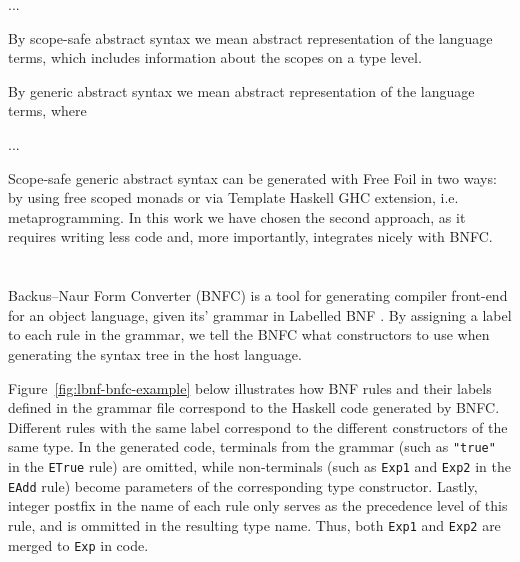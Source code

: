 ...

By scope-safe abstract syntax we mean abstract representation of the language terms, which includes information about the scopes on a type level.

By generic abstract syntax we mean abstract representation of the language terms, where 

...

Scope-safe generic abstract syntax can be generated with Free Foil in two ways: by using free scoped monads or via Template Haskell \cite{SheardPeytonJones2002_TH} GHC extension, i.e. metaprogramming. In this work we have chosen the second approach, as it requires writing less code and, more importantly, integrates nicely with BNFC.


\section{}

Backus–Naur Form Converter (BNFC) \cite{BNFC} is a tool for generating compiler front-end for an object language, given its' grammar in Labelled BNF \cite{BackusNaurForm2003}. By assigning a label to each rule in the grammar, we tell the BNFC what constructors to use when generating the syntax tree in the host language.

Figure~\ref{fig:lbnf-bnfc-example} below illustrates how BNF rules and their labels defined in the grammar file correspond to the Haskell code generated by BNFC. Different rules with the same label correspond to the different constructors of the same type. In the generated code, terminals from the grammar (such as \texttt{"true"} in the \texttt{ETrue} rule) are omitted, while non-terminals (such as \texttt{Exp1} and \texttt{Exp2} in the \texttt{EAdd} rule) become parameters of the corresponding type constructor. Lastly, integer postfix in the name of each rule only serves as the precedence level of this rule, and is ommitted in the resulting type name. Thus, both \texttt{Exp1} and \texttt{Exp2} are merged to \texttt{Exp} in code.

